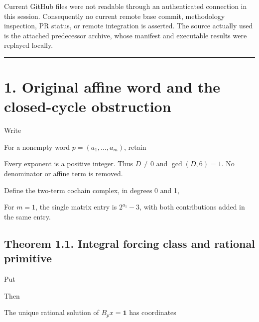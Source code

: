 Current GitHub files were not readable through an authenticated
connection in this session. Consequently no current remote base commit,
methodology inspection, PR status, or remote integration is asserted.
The source actually used is the attached predecessor archive, whose
manifest and executable results were replayed locally.

\begin{center}\rule{0.5\linewidth}{0.5pt}\end{center}

\section{1. Original affine word and the closed-cycle obstruction}

Write


For a nonempty word \(p=(a_1,\ldots,a_m)\), retain


Every exponent is a positive integer. Thus \(D\ne0\) and
\(\gcd(D,6)=1\). No denominator or affine term is removed.

Define the two-term cochain complex, in degrees 0 and 1,


For \(m=1\), the single matrix entry is \(2^{a_1}-3\), with both
contributions added in the same entry.

\subsection{Theorem 1.1. Integral forcing class and rational primitive}

Put


Then


The unique rational solution of \(B_px=\mathbf1\) has coordinates

